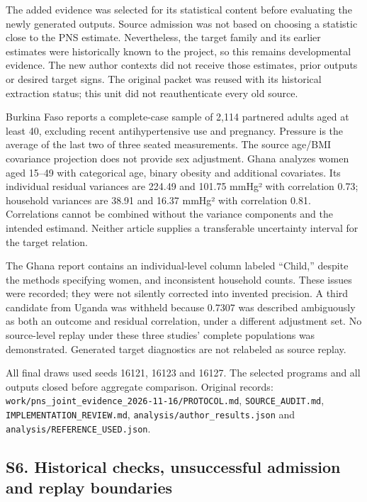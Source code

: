 \documentclass[sigconf,anonymous,nonacm]{acmart}
\begin{document}
The added evidence was selected for its statistical content before evaluating the newly generated outputs. Source admission was not based on choosing a statistic close to the PNS estimate. Nevertheless, the target family and its earlier estimates were historically known to the project, so this remains developmental evidence. The new author contexts did not receive those estimates, prior outputs or desired target signs. The original packet was reused with its historical extraction status; this unit did not reauthenticate every old source.


Burkina Faso reports a complete-case sample of 2,114 partnered adults aged at least 40, excluding recent antihypertensive use and pregnancy. Pressure is the average of the last two of three seated measurements. The source age/\allowbreak{}BMI covariance projection does not provide sex adjustment. Ghana analyzes women aged 15–\allowbreak{}49 with categorical age, binary obesity and additional covariates. Its individual residual variances are 224.49 and 101.75 mmHg² with correlation 0.73; household variances are 38.91 and 16.37 mmHg² with correlation 0.81. Correlations cannot be combined without the variance components and the intended estimand. Neither article supplies a transferable uncertainty interval for the target relation.


The Ghana report contains an individual-level column labeled “Child,” despite the methods specifying women, and inconsistent household counts. These issues were recorded; they were not silently corrected into invented precision. A third candidate from Uganda was withheld because 0.7307 was described ambiguously as both an outcome and residual correlation, under a different adjustment set. No source-level replay under these three studies' complete populations was demonstrated. Generated target diagnostics are not relabeled as source replay.


All final draws used seeds 16121, 16123 and 16127. The selected programs and all outputs closed before aggregate comparison. Original records: \texttt{work/\allowbreak{}pns\_\allowbreak{}joint\_\allowbreak{}evidence\_\allowbreak{}2026-\allowbreak{}11-\allowbreak{}16/\allowbreak{}PROTOCOL.md}, \texttt{SOURCE\_\allowbreak{}AUDIT.md}, \texttt{IMPLEMENTATION\_\allowbreak{}REVIEW.md}, \texttt{analysis/\allowbreak{}author\_\allowbreak{}results.json} and \texttt{analysis/\allowbreak{}REFERENCE\_\allowbreak{}USED.json}.



\subsection*{S6. Historical checks, unsuccessful admission and replay boundaries}
\end{document}
